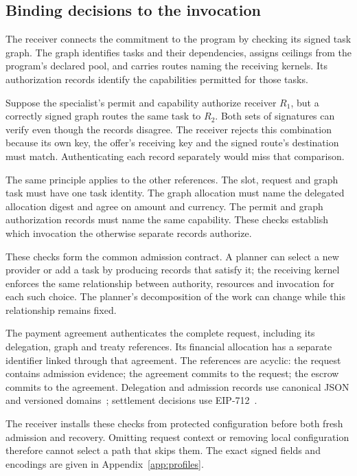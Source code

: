 \subsection{Binding decisions to the invocation}
The receiver connects the commitment to the program by checking its signed task
graph. The graph identifies tasks and their dependencies, assigns ceilings from
the program's declared pool, and carries routes naming the receiving kernels.
Its authorization records identify the capabilities permitted for those tasks.

Suppose the specialist's permit and capability authorize receiver $R_1$, but a
correctly signed graph routes the same task to $R_2$. Both sets of signatures
can verify even though the records disagree. The receiver rejects this
combination because its own key, the offer's receiving key and the signed
route's destination must match. Authenticating each record separately would
miss that comparison.

The same principle applies to the other references. The slot, request and graph
task must have one task identity. The graph allocation must name the delegated
allocation digest and agree on amount and currency. The permit and graph
authorization records must name the same capability. These checks establish
which invocation the otherwise separate records authorize.

These checks form the common admission contract. A planner can select a new
provider or add a task by producing records that satisfy it; the receiving kernel
enforces the same relationship between authority, resources and invocation for
each such choice. The planner's decomposition of the work can change while this
relationship remains fixed.

The payment agreement authenticates the complete request, including its
delegation, graph and treaty references. Its financial allocation has a separate
identifier linked through that agreement. The references are acyclic: the request
contains admission evidence; the agreement commits to the request; the escrow
commits to the agreement. Delegation and admission records use canonical JSON
and versioned domains~\cite{jcs}; settlement decisions use EIP-712~\cite{eip712}.

The receiver installs these checks from protected configuration before both
fresh admission and recovery. Omitting request context or removing local
configuration therefore cannot select a path that skips them. The exact signed
fields and encodings are given in Appendix~\ref{app:profiles}.
